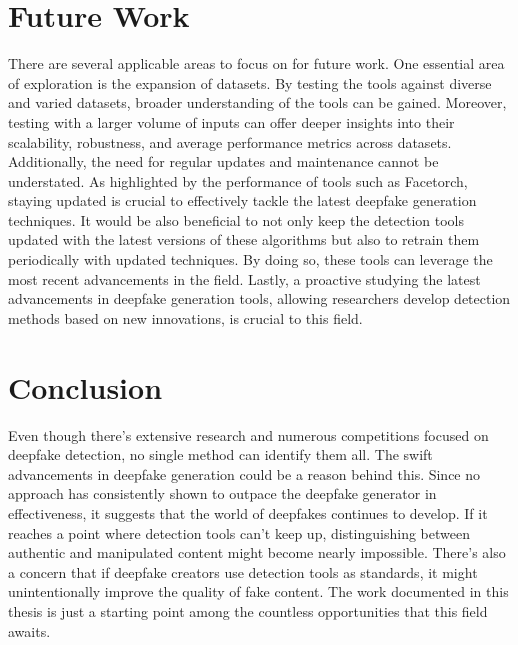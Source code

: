 \section{Future Work}
There are several applicable areas to focus on for future work. One essential area of 
exploration is the expansion of datasets. By testing the tools against diverse and varied
datasets, broader understanding of the tools can be gained. Moreover, testing with a 
larger volume of inputs can offer deeper insights into their scalability, robustness, 
and average performance metrics across datasets. Additionally, the need for regular 
updates and maintenance cannot be understated. As highlighted by the performance of 
tools such as Facetorch, staying updated is crucial to effectively tackle the latest 
deepfake generation techniques. It would be also beneficial to not only keep the 
detection tools updated with the latest versions of these algorithms but also to 
retrain them periodically with updated techniques. By doing so, these tools can 
leverage the most recent advancements in the field. Lastly, a proactive studying the
latest advancements in deepfake generation tools, allowing researchers develop detection
methods based on new innovations, is crucial to this field.

\section{Conclusion}
Even though there's extensive research and numerous competitions focused on deepfake 
detection, no single method can identify them all. The swift advancements in 
deepfake generation could be a reason behind this. Since no approach has consistently 
shown to outpace the deepfake generator in effectiveness, it suggests that the world 
of deepfakes continues to develop. If it reaches a point where detection tools can't 
keep up, distinguishing between authentic and manipulated content might become 
nearly impossible. There's also a concern that if deepfake creators use detection 
tools as standards, it might unintentionally improve the quality of fake content.
The work documented in this thesis is just a starting point among the countless 
opportunities that this field awaits.
